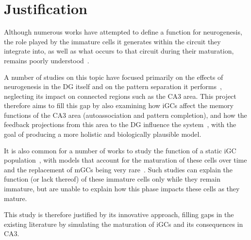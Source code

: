 \chapter{Justification}

Although numerous works have attempted to define a function for neurogenesis, the role played by the immature cells it generates
within the circuit they integrate into, as well as what occurs to that circuit during their maturation, remains poorly
understood~\parencite{aimoneComputational2016, aimoneModeling2011, berdugo-vegaSharpening2023, faresNeurogenesis2019}.

A number of studies on this topic have focused primarily on the effects of neurogenesis in the DG itself and on the pattern
separation it performs~\parencite{berdugo-vegaSharpening2023, kimAdult2024, wangEffect2024}, neglecting its impact on connected
regions such as the CA3 area. This project therefore aims to fill this gap by also examining how iGCs affect the memory
functions of the CA3 area (autoassociation and pattern completion), and how the feedback projections from this area to the DG
influence the system~\parencite{myersPattern2011}, with the goal of producing a more holistic and biologically plausible model.

It is also common for a number of works to study the function of a static iGC population~\parencite{aimoneComputational2016,
berdugo-vegaSharpening2023}, with models that account for the maturation of these cells over time and the replacement of mGCs
being very rare~\parencite{aimoneComputational2009}. Such studies can explain the function (or lack thereof) of these immature cells
only while they remain immature, but are unable to explain how this phase impacts these cells as they mature.

This study is therefore justified by its innovative approach, filling gaps in the existing literature by simulating the
maturation of iGCs and its consequences in CA3.
